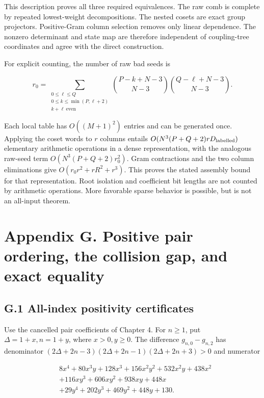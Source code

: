 \documentclass[a4paper,11pt]{article}
\numberwithin{equation}{section}
\begin{document}
This description proves all three required equivalences. The raw comb is complete by repeated lowest-weight decompositions. The nested cosets are exact group projectors. Positive-Gram column selection removes only linear dependence. The nonzero determinant and state map are therefore independent of coupling-tree coordinates and agree with the direct construction.

For explicit counting, the number of raw bad seeds is

\[
r_0=\sum_{\substack{0\le\ell\le Q\\0\le k\le\min(P,\ell+2)\\k+\ell\ \mathrm{even}}}
\binom{P-k+N-3}{N-3}\binom{Q-\ell+N-3}{N-3}.
\tag{F.14}
\]

Each local table has \(O((M+1)^2)\) entries and can be generated once. Applying the coset words to \(r\) columns entails \(O(N^3(P+Q+2)rD_{\rm labelled})\) elementary arithmetic operations in a dense representation, with the analogous raw-seed term \(O(N^3(P+Q+2)r_0^2)\). Gram contractions and the two column eliminations give \(O(r_0r^2+rR^2+r^3)\). This proves the stated assembly bound for that representation. Root isolation and coefficient bit lengths are not counted by arithmetic operations. More favorable sparse behavior is possible, but is not an all-input theorem.

\clearpage
\hypertarget{appendix-g.-positive-pair-ordering-the-collision-gap-and-exact-equality}{%
\section{Appendix G. Positive pair ordering, the collision gap, and exact equality}\label{appendix-g.-positive-pair-ordering-the-collision-gap-and-exact-equality}}

\hypertarget{g.1-all-index-positivity-certificates}{%
\subsection{G.1 All-index positivity certificates}\label{g.1-all-index-positivity-certificates}}

Use the cancelled pair coefficients of Chapter 4. For \(n\ge1\), put \(\Delta=1+x,n=1+y\), where \(x>0,y\ge0\). The difference \(g_{n,0}-g_{n,2}\) has denominator \((2\Delta+2n-3)(2\Delta+2n-1)(2\Delta+2n+3)>0\) and numerator

\[
\begin{aligned}
&8x^4+80x^3y+128x^3+156x^2y^2+532x^2y+438x^2\\
&+116xy^3+606xy^2+938xy+448x\\
&+29y^4+202y^3+469y^2+448y+130.
\end{aligned}
\tag{G.1}
\]
\end{document}
